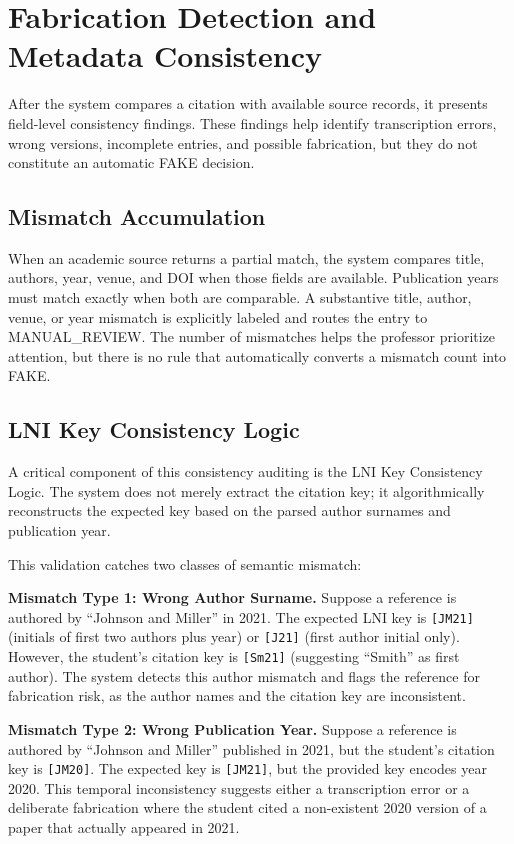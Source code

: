 \documentclass[12pt,a4paper,oneside]{report}
\begin{document}
\section{Fabrication Detection and Metadata Consistency}

After the system compares a citation with available source records, it presents field-level consistency findings. These findings help identify transcription errors, wrong versions, incomplete entries, and possible fabrication, but they do not constitute an automatic FAKE decision.

\subsection{Mismatch Accumulation}
When an academic source returns a partial match, the system compares title, authors, year, venue, and DOI when those fields are available. Publication years must match exactly when both are comparable. A substantive title, author, venue, or year mismatch is explicitly labeled and routes the entry to MANUAL\_REVIEW. The number of mismatches helps the professor prioritize attention, but there is no rule that automatically converts a mismatch count into FAKE.

\subsection{LNI Key Consistency Logic}
A critical component of this consistency auditing is the LNI Key Consistency Logic. The system does not merely extract the citation key; it algorithmically reconstructs the expected key based on the parsed author surnames and publication year. 

This validation catches two classes of semantic mismatch:

\textbf{Mismatch Type 1: Wrong Author Surname.} Suppose a reference is 
authored by ``Johnson and Miller'' in 2021. The expected LNI key is 
\texttt{[JM21]} (initials of first two authors plus year) or \texttt{[J21]} 
(first author initial only). However, the student's citation key is 
\texttt{[Sm21]} (suggesting ``Smith'' as first author). The system detects 
this author mismatch and flags the reference for fabrication risk, as the 
author names and the citation key are inconsistent.

\textbf{Mismatch Type 2: Wrong Publication Year.} Suppose a reference is 
authored by ``Johnson and Miller'' published in 2021, but the student's 
citation key is \texttt{[JM20]}. The expected key is \texttt{[JM21]}, but the 
provided key encodes year 2020. This temporal inconsistency suggests either a 
transcription error or a deliberate fabrication where the student cited a 
non-existent 2020 version of a paper that actually appeared in 2021.
\end{document}
